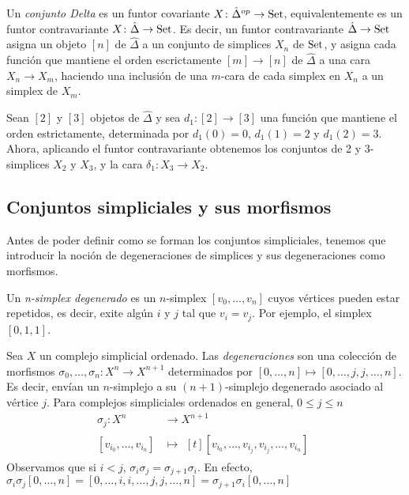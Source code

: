 \documentclass[../main.tex]{subfiles}
\begin{document}
\begin{defi}
    Un \emph{conjunto Delta} es un funtor covariante $X\colon \hat{\Delta}^{op} \to \mathop{\rm Set}$, equivalentemente es un funtor contravariante $X\colon \hat{\Delta} \to \mathop{\rm Set}$.
    Es decir, un funtor contravariante $\hat{\Delta} \to \mathop{\rm Set}$ asigna un objeto $[n]$ de $\hat{\Delta}$ a un conjunto de simplices $X_n$ de $\mathop{\rm Set}$, y asigna cada funci\'on que mantiene el orden escrictamente $[m]\to[n]$ de $\hat{\Delta}$ a una cara $X_n \to X_m$, haciendo una inclusi\'on de una $m$-cara de cada simplex en $X_n$ a un simplex de $X_m$.
\end{defi}
\begin{ex}
    Sean $[2]$ y $[3]$ objetos de $\hat{\Delta}$ y sea $d_1\colon [2] \to [3]$ una funci\'on que mantiene el orden estrictamente, determinada por $d_1(0)=0$, $d_1(1)=2$ y $d_1(2)=3$. Ahora, aplicando el funtor contravariante obtenemos los conjuntos de 2 y 3-simplices $X_2$ y $X_3$, y la cara $\delta_1\colon X_3 \to X_2$.
\end{ex}


\subsection{Conjuntos simpliciales y sus morfismos}
Antes de poder definir como se forman los conjuntos simpliciales, tenemos que introducir la noci\'on de degeneraciones de simplices y sus degeneraciones como morfismos.

\begin{defi}
    Un \emph{n-simplex degenerado} es un $n$-simplex $[v_0,\dots,v_n]$ cuyos v\'ertices pueden estar repetidos, es decir, exite alg\'un $i$ y $j$ tal que $v_i=v_j$. Por ejemplo, el simplex $[0,1,1]$.
\end{defi}
\begin{defi}
    Sea $X$ un complejo simplicial ordenado. Las \emph{degeneraciones} son una colecci\'on de morfismos $\sigma_0,\dots,\sigma_n\colon X^n\to X^{n+1}$ determinados por $[0,\dots,n] \mapsto [0,\dots,j,j,\dots,n]$. Es decir, env\'ian un $n$-simplejo a su $(n+1)$-simplejo degenerado asociado al v\'ertice $j$.
    Para complejos simpliciales ordenados en general, $0\le j \le n$
    \begin{align*}
        \sigma_j: X^n           & \longrightarrow X^{n+1} \\
        [v_{i_0},\dots,v_{i_n}] & \longmapsto\!
        \begin{aligned}[t]
            [v_{i_0},\dots,v_{i_j},v_{i_j},\dots,v_{i_n}]
        \end{aligned}
    \end{align*}
    Observamos que si $i<j$, $\sigma_i\sigma_j = \sigma_{j+1}\sigma_{i}$. En efecto, $\sigma_i\sigma_j[0,\dots,n] = [0,\dots,i,i,\dots,j,j,\dots,n] = \sigma_{j+1}\sigma_{i}[0,\dots,n]$
\end{defi}
\end{document}
